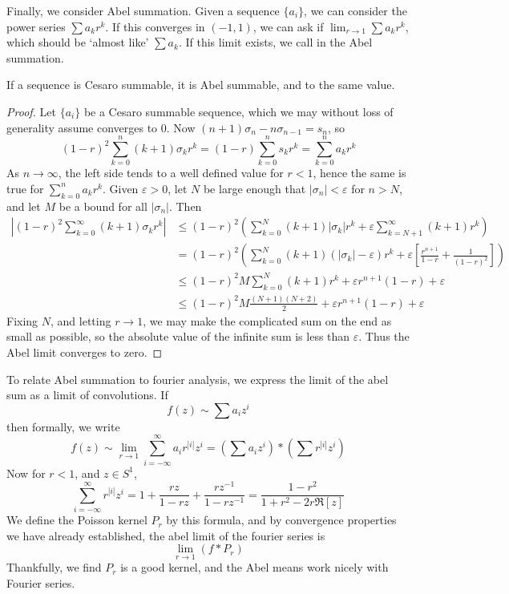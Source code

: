 Finally, we consider Abel summation. Given a sequence $\{ a_i \}$, we can consider the power series $\sum a_k r^k$. If this converges in $(-1,1)$, we can ask if $\lim_{r \to 1} \sum a_k r^k$, which should be `almost like' $\sum a_k$. If this limit exists, we call in the Abel summation.

\begin{theorem}
    If a sequence is Cesaro summable, it is Abel summable, and to the same value.
\end{theorem}
\begin{proof}
    Let $\{ a_i \}$ be a Cesaro summable sequence, which we may without loss of generality assume converges to $0$. Now $(n + 1)\sigma_n - n \sigma_{n-1} = s_n$, so
    \[ (1 - r)^2 \sum_{k = 0}^n (k + 1) \sigma_k r^k = (1 - r) \sum_{k = 0}^n s_k r^k = \sum_{k = 0}^n a_k r^k \]
    As $n \to \infty$, the left side tends to a well defined value for $r < 1$, hence the same is true for $\sum_{k = 0}^n a_k r^k$. Given $\varepsilon > 0$, let $N$ be large enough that $|\sigma_n| < \varepsilon$ for $n > N$, and let $M$ be a bound for all $|\sigma_n|$. Then
    \begin{align*}
        \left| (1 - r)^2 \sum_{k = 0}^\infty (k + 1) \sigma_k r^k \right| &\leq (1 - r)^2 \left( \sum_{k = 0}^N (k + 1) |\sigma_k| r^k + \varepsilon \sum_{k = N+1}^\infty (k + 1) r^k \right)\\
        &= (1 - r)^2 \left( \sum_{k = 0}^N (k + 1) (|\sigma_k| - \varepsilon) r^k + \varepsilon \left[ \frac{r^{n+1}}{1-r} + \frac{1}{(1 - r)^2} \right] \right)\\
        &\leq (1 - r)^2 M \sum_{k = 0}^N (k + 1) r^k + \varepsilon r^{n+1} (1 - r) + \varepsilon\\
        &\leq (1 - r)^2 M \frac{(N+1)(N+2)}{2} + \varepsilon r^{n+1} (1 - r) + \varepsilon
    \end{align*}
    Fixing $N$, and letting $r \to 1$, we may make the complicated sum on the end as small as possible, so the absolute value of the infinite sum is less than $\varepsilon$. Thus the Abel limit converges to zero.
\end{proof}

To relate Abel summation to fourier analysis, we express the limit of the abel sum as a limit of convolutions. If
%
\[ f(z) \sim \sum a_i z^i \]
%
then formally, we write
%
\[ f(z) \sim \lim_{r \to 1} \sum_{i = -\infty}^\infty a_i r^{|i|} z^i = \left( \sum a_i z^i \right) * \left( \sum r^{|i|} z^i \right) \]
%
Now for $r < 1$, and $z \in S^1$,
%
\[ \sum_{i = -\infty}^\infty r^{|i|} z^i = 1 + \frac{rz}{1 - rz} + \frac{rz^{-1}}{1 - rz^{-1}} = \frac{1 - r^2}{1 + r^2 - 2r \Re[z]} \]
%
We define the Poisson kernel $P_r$ by this formula, and by convergence properties we have already established, the abel limit of the fourier series is
%
\[ \lim_{r \to 1} (f * P_r) \]
%
Thankfully, we find $P_r$ is a good kernel, and the Abel means work nicely with Fourier series.



